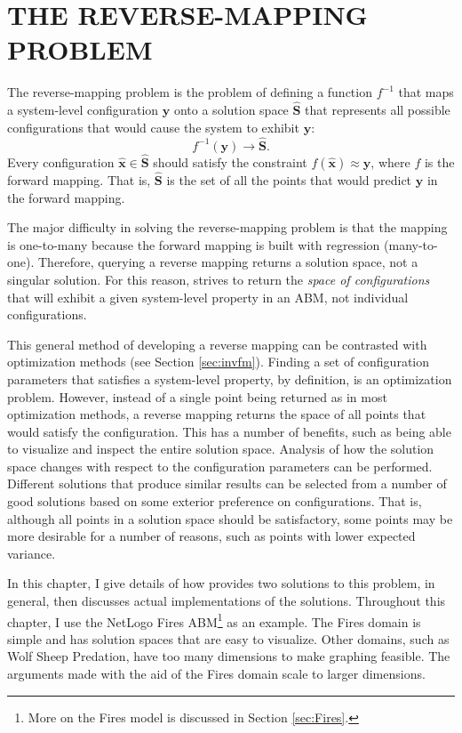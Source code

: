 \chapter{THE REVERSE-MAPPING PROBLEM}
\thispagestyle{plain}

\label{ReverseMapping}

The reverse-mapping problem is the problem of defining a function $f^{-1}$ that maps a system-level configuration $\mathbf y$ onto a solution space $\hat{\mathbf S}$ that represents all possible configurations that would cause the system to exhibit $\mathbf y$:
   \[ f^{-1}(\mathbf y) \rightarrow \hat{\mathbf S}. \]
Every configuration $\hat {\mathbf x} \in \hat {\mathbf S}$ should satisfy the constraint $f(\hat{\mathbf x}) \approx \mathbf y$, where $f$ is the forward mapping.
That is, $\hat{\mathbf S}$ is the set of all the points that would predict $\mathbf y$ in the forward mapping.

The major difficulty in solving the reverse-mapping problem is that the mapping is one-to-many because the forward mapping is built with regression (many-to-one).
Therefore, querying a reverse mapping returns a solution space, not a singular solution.
For this reason, \fw strives to return the \textit{space of configurations} that will exhibit a given system-level property in an ABM, not individual configurations.

This general method of developing a reverse mapping can be contrasted with optimization methods (see Section \ref{sec:invfm}).
Finding a set of configuration parameters that satisfies a system-level property, by definition, is an optimization problem.
However, instead of a single point being returned as in most optimization methods, a reverse mapping returns the space of all points that would satisfy the configuration.
This has a number of benefits, such as being able to visualize and inspect the entire solution space.
Analysis of how the solution space changes with respect to the configuration parameters can be performed.
Different solutions that produce similar results can be selected from a number of good solutions based on some exterior preference on configurations.
That is, although all points in a solution space should be satisfactory, some points may be more desirable for a number of reasons, such as points with lower expected variance.

In this chapter, I give details of how \fw provides two solutions to this problem, in general, then discusses actual implementations of the solutions.
Throughout this chapter, I use the NetLogo Fires ABM\footnote{More on the Fires model is discussed in Section \ref{sec:Fires}.} as an example.
The Fires domain is simple and has solution spaces that are easy to visualize.
Other domains, such as Wolf Sheep Predation, have too many dimensions to make graphing feasible.
The arguments made with the aid of the Fires domain scale to larger dimensions.



